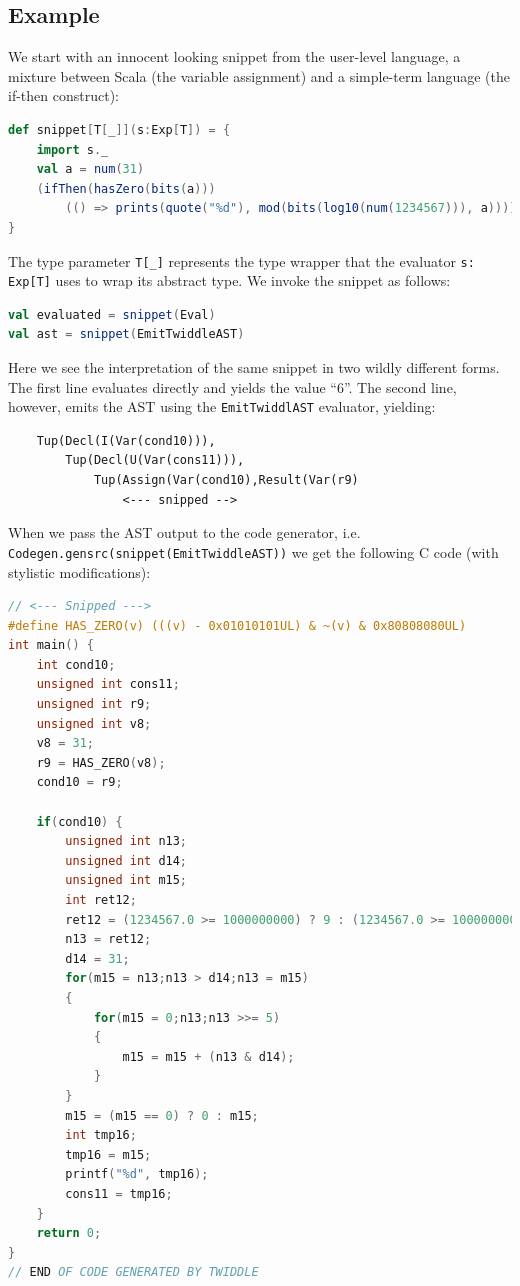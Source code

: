\documentclass{article}
\begin{document}
\subsection{Example}
We start with an innocent looking snippet from the user-level language, a mixture between Scala (the variable assignment) and a simple-term language (the if-then construct):
\begin{lstlisting}[language=Scala]
def snippet[T[_]](s:Exp[T]) = {
	import s._
	val a = num(31)
	(ifThen(hasZero(bits(a)))
		(() => prints(quote("%d"), mod(bits(log10(num(1234567))), a))))
}
\end{lstlisting}
The type parameter \texttt{T[\_]} represents the type wrapper that the evaluator \texttt{s: Exp[T]} uses to wrap its abstract type. We invoke the snippet as follows:
\begin{lstlisting}[language=Scala]
val evaluated = snippet(Eval)
val ast = snippet(EmitTwiddleAST)
\end{lstlisting}
Here we see the interpretation of the same snippet in two wildly different forms. The first line evaluates directly and yields the value ``6''. 
The second line, however, emits the AST using the \texttt{EmitTwiddlAST} evaluator, yielding:
\begin{verbatim}
	Tup(Decl(I(Var(cond10))),
		Tup(Decl(U(Var(cons11))),
			Tup(Assign(Var(cond10),Result(Var(r9)
				<--- snipped -->
\end{verbatim}

When we pass the AST output to the code generator, i.e. \texttt{Codegen.gensrc(snippet(EmitTwiddleAST))} we get the following C code (with stylistic modifications):

\begin{lstlisting}[language=C]
// <--- Snipped --->
#define HAS_ZERO(v) (((v) - 0x01010101UL) & ~(v) & 0x80808080UL)
int main() {
    int cond10;
    unsigned int cons11;
    unsigned int r9;
    unsigned int v8;
    v8 = 31;
    r9 = HAS_ZERO(v8);
    cond10 = r9;

    if(cond10) {
        unsigned int n13;
        unsigned int d14;
        unsigned int m15;
        int ret12;
        ret12 = (1234567.0 >= 1000000000) ? 9 : (1234567.0 >= 100000000) ? 8 : (1234567.0 >= 10000000) ? 7 : (1234567.0 >= 1000000) ? 6 : (1234567.0 >= 100000) ? 5 : (1234567.0 >= 10000) ? 4 : (1234567.0 >= 1000) ? 3 : (1234567.0 >= 100) ? 2 : (1234567.0 >= 10) ? 1 : 0;
        n13 = ret12;
        d14 = 31;
        for(m15 = n13;n13 > d14;n13 = m15)
        {
            for(m15 = 0;n13;n13 >>= 5)
            {
                m15 = m15 + (n13 & d14);
            }
        }
        m15 = (m15 == 0) ? 0 : m15;
        int tmp16;
        tmp16 = m15;
        printf("%d", tmp16);
        cons11 = tmp16;
    }
    return 0;
}
// END OF CODE GENERATED BY TWIDDLE
\end{lstlisting}
\end{document}
